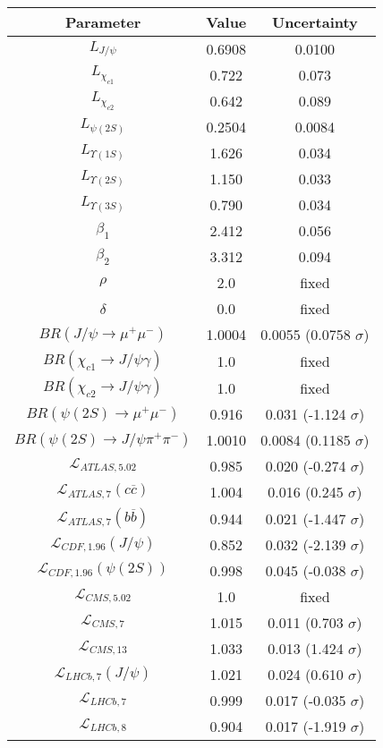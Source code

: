 \begin{table}[h!]
\centering
\begin{tabular}{c|c|c}
Parameter & Value & Uncertainty \\
\hline
$L_{J/\psi}$ & 0.6908 & 0.0100 \\
$L_{\chi_{c1}}$ & 0.722 & 0.073 \\
$L_{\chi_{c2}}$ & 0.642 & 0.089 \\
$L_{\psi(2S)}$ & 0.2504 & 0.0084 \\
$L_{\Upsilon(1S)}$ & 1.626 & 0.034 \\
$L_{\Upsilon(2S)}$ & 1.150 & 0.033 \\
$L_{\Upsilon(3S)}$ & 0.790 & 0.034 \\
$\beta_1$ & 2.412 & 0.056 \\
$\beta_2$ & 3.312 & 0.094 \\
$\rho$ & 2.0 & fixed \\
$\delta$ & 0.0 & fixed \\
$BR(J/\psi\rightarrow\mu^+\mu^-)$ & 1.0004 & 0.0055 (0.0758 $\sigma$) \\
$BR(\chi_{c1}\rightarrow J/\psi\gamma)$ & 1.0 & fixed \\
$BR(\chi_{c2}\rightarrow J/\psi\gamma)$ & 1.0 & fixed \\
$BR(\psi(2S)\rightarrow\mu^+\mu^-)$ & 0.916 & 0.031 (-1.124 $\sigma$) \\
$BR(\psi(2S)\rightarrow J/\psi\pi^+\pi^-)$ & 1.0010 & 0.0084 (0.1185 $\sigma$) \\
$\mathcal L_{ATLAS,5.02}$ & 0.985 & 0.020 (-0.274 $\sigma$) \\
$\mathcal L_{ATLAS,7}(c\overline c)$ & 1.004 & 0.016 (0.245 $\sigma$) \\
$\mathcal L_{ATLAS,7}(b\overline b)$ & 0.944 & 0.021 (-1.447 $\sigma$) \\
$\mathcal L_{CDF,1.96}(J/\psi)$ & 0.852 & 0.032 (-2.139 $\sigma$) \\
$\mathcal L_{CDF,1.96}(\psi(2S))$ & 0.998 & 0.045 (-0.038 $\sigma$) \\
$\mathcal L_{CMS,5.02}$ & 1.0 & fixed \\
$\mathcal L_{CMS,7}$ & 1.015 & 0.011 (0.703 $\sigma$) \\
$\mathcal L_{CMS,13}$ & 1.033 & 0.013 (1.424 $\sigma$) \\
$\mathcal L_{LHCb,7}(J/\psi)$ & 1.021 & 0.024 (0.610 $\sigma$) \\
$\mathcal L_{LHCb,7}$ & 0.999 & 0.017 (-0.035 $\sigma$) \\
$\mathcal L_{LHCb,8}$ & 0.904 & 0.017 (-1.919 $\sigma$) \\

\end{tabular}
\end{table}

